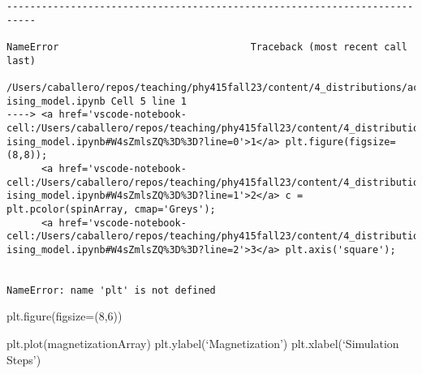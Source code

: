 \begin{verbatim}
---------------------------------------------------------------------------

NameError                                 Traceback (most recent call last)

/Users/caballero/repos/teaching/phy415fall23/content/4_distributions/activity-ising_model.ipynb Cell 5 line 1
----> <a href='vscode-notebook-cell:/Users/caballero/repos/teaching/phy415fall23/content/4_distributions/activity-ising_model.ipynb#W4sZmlsZQ%3D%3D?line=0'>1</a> plt.figure(figsize=(8,8));
      <a href='vscode-notebook-cell:/Users/caballero/repos/teaching/phy415fall23/content/4_distributions/activity-ising_model.ipynb#W4sZmlsZQ%3D%3D?line=1'>2</a> c = plt.pcolor(spinArray, cmap='Greys');
      <a href='vscode-notebook-cell:/Users/caballero/repos/teaching/phy415fall23/content/4_distributions/activity-ising_model.ipynb#W4sZmlsZQ%3D%3D?line=2'>3</a> plt.axis('square');


NameError: name 'plt' is not defined
\end{verbatim}

\begin{Shaded}
\begin{Highlighting}[]

\end{Highlighting}
\end{Shaded}

plt.figure(figsize=(8,6))

plt.plot(magnetizationArray) plt.ylabel(`Magnetization')
plt.xlabel(`Simulation Steps')

\begin{Shaded}
\begin{Highlighting}[]

\end{Highlighting}
\end{Shaded}
